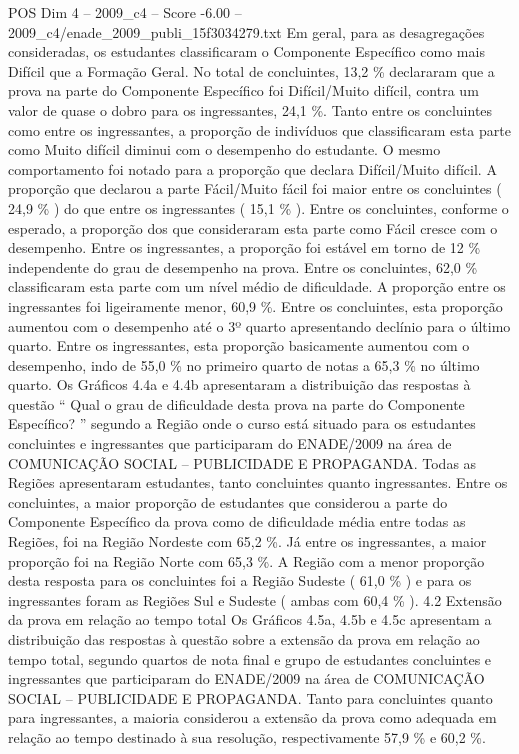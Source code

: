\begin{textsample}{POS Dim 4 – 2009\_c4 – Score -6.00 – 2009\_c4/enade\_2009\_publi\_15f3034279.txt}
Em geral, para as desagregações consideradas, os estudantes classificaram o Componente Específico como mais Difícil que a Formação Geral.
No total de concluintes, 13,2 \% declararam que a prova na parte do Componente Específico foi Difícil/Muito difícil, contra um valor de quase o dobro para os ingressantes, 24,1 \%.
Tanto entre os concluintes como entre os ingressantes, a proporção de indivíduos que classificaram esta parte como Muito difícil diminui com o desempenho do estudante.
O mesmo comportamento foi notado para a proporção que declara Difícil/Muito difícil.
A proporção que declarou a parte Fácil/Muito fácil foi maior entre os concluintes ( 24,9 \% ) do que entre os ingressantes ( 15,1 \% ).
Entre os concluintes, conforme o esperado, a proporção dos que consideraram esta parte como Fácil cresce com o desempenho.
Entre os ingressantes, a proporção foi estável em torno de 12 \% independente do grau de desempenho na prova.
Entre os concluintes, 62,0 \% classificaram esta parte com um nível médio de dificuldade.
A proporção entre os ingressantes foi ligeiramente menor, 60,9 \%.
Entre os concluintes, esta proporção aumentou com o desempenho até o 3º quarto apresentando declínio para o último quarto.
Entre os ingressantes, esta proporção basicamente aumentou com o desempenho, indo de 55,0 \% no primeiro quarto de notas a 65,3 \% no último quarto.
Os Gráficos 4.4a e 4.4b apresentaram a distribuição das respostas à questão “ Qual o grau de dificuldade desta prova na parte do Componente Específico? ” segundo a Região onde o curso está situado para os estudantes concluintes e ingressantes que participaram do ENADE/2009 na área de COMUNICAÇÃO SOCIAL – PUBLICIDADE E PROPAGANDA.
Todas as Regiões apresentaram estudantes, tanto concluintes quanto ingressantes.
Entre os concluintes, a maior proporção de estudantes que considerou a parte do Componente Específico da prova como de dificuldade média entre todas as Regiões, foi na Região Nordeste com 65,2 \%.
Já entre os ingressantes, a maior proporção foi na Região Norte com 65,3 \%.
A Região com a menor proporção desta resposta para os concluintes foi a Região Sudeste ( 61,0 \% ) e para os ingressantes foram as Regiões Sul e Sudeste ( ambas com 60,4 \% ). 4.2 Extensão da prova em relação ao tempo total Os Gráficos 4.5a, 4.5b e 4.5c apresentam a distribuição das respostas à questão sobre a extensão da prova em relação ao tempo total, segundo quartos de nota final e grupo de estudantes concluintes e ingressantes que participaram do ENADE/2009 na área de COMUNICAÇÃO SOCIAL – PUBLICIDADE E PROPAGANDA.
Tanto para concluintes quanto para ingressantes, a maioria considerou a extensão da prova como adequada em relação ao tempo destinado à sua resolução, respectivamente 57,9 \% e 60,2 \%.

\end{textsample}
